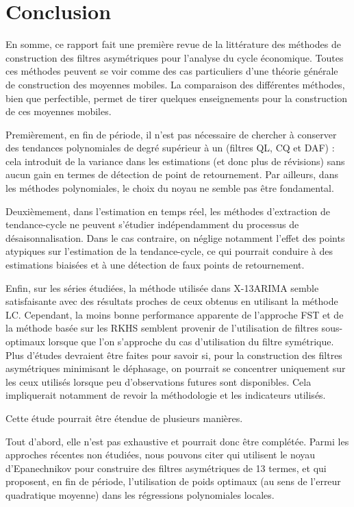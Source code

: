 \documentclass[
  11pt,
  french,
  a4paper]{article}
\newcommand\1{\mathds{1}}
\begin{document}
\newpage

\hypertarget{conclusion}{%
\section*{Conclusion}\label{conclusion}}

En somme, ce rapport fait une première revue de la littérature des méthodes de construction des filtres asymétriques pour l'analyse du cycle économique.
Toutes ces méthodes peuvent se voir comme des cas particuliers d'une théorie générale de construction des moyennes mobiles.
La comparaison des différentes méthodes, bien que perfectible, permet de tirer quelques enseignements pour la construction de ces moyennes mobiles.

Premièrement, en fin de période, il n'est pas nécessaire de chercher à conserver des tendances polynomiales de degré supérieur à un (filtres QL, CQ et DAF) : cela introduit de la variance dans les estimations (et donc plus de révisions) sans aucun gain en termes de détection de point de retournement.
Par ailleurs, dans les méthodes polynomiales, le choix du noyau ne semble pas être fondamental.

Deuxièmement, dans l'estimation en temps réel, les méthodes d'extraction de tendance-cycle ne peuvent s'étudier indépendamment du processus de désaisonnalisation.
Dans le cas contraire, on néglige notamment l'effet des points atypiques sur l'estimation de la tendance-cycle, ce qui pourrait conduire à des estimations biaisées et à une détection de faux points de retournement.

Enfin, sur les séries étudiées, la méthode utilisée dans X-13ARIMA semble satisfaisante avec des résultats proches de ceux obtenus en utilisant la méthode LC.
Cependant, la moins bonne performance apparente de l'approche FST et de la méthode basée sur les RKHS semblent provenir de l'utilisation de filtres sous-optimaux lorsque que l'on s'approche du cas d'utilisation du filtre symétrique.
Plus d'études devraient être faites pour savoir si, pour la construction des filtres asymétriques minimisant le déphasage, on pourrait se concentrer uniquement sur les ceux utilisés lorsque peu d'observations futures sont disponibles.
Cela impliquerait notamment de revoir la méthodologie et les indicateurs utilisés.

Cette étude pourrait être étendue de plusieurs manières.

Tout d'abord, elle n'est pas exhaustive et pourrait donc être complétée.
Parmi les approches récentes non étudiées, nous pouvons citer \textcite{vasyechko2014new} qui utilisent le noyau d'Epanechnikov pour construire des filtres asymétriques de 13 termes, et \textcite{FengSchafer2021} qui proposent, en fin de période, l'utilisation de poids optimaux (au sens de l'erreur quadratique moyenne) dans les régressions polynomiales locales.
\end{document}
